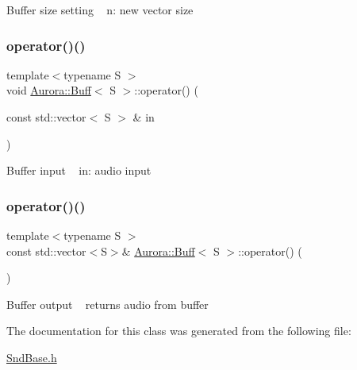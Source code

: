 Buffer size setting ~\newline
n\+: new vector size \mbox{\label{class_aurora_1_1_buff_a40884550c6105f427148f8663a54bc71}} 
\subsubsection{\texorpdfstring{operator()()}{operator()()}\hspace{0.1cm}{\footnotesize\ttfamily [1/2]}}
{\footnotesize\ttfamily template$<$typename S $>$ \\
void \hyperlink{class_aurora_1_1_buff}{Aurora\+::\+Buff}$<$ S $>$\+::operator() (\begin{DoxyParamCaption}\item[{const std\+::vector$<$ S $>$ \&}]{in }\end{DoxyParamCaption})\hspace{0.3cm}{\ttfamily [inline]}}

Buffer input ~\newline
in\+: audio input ~\newline
\mbox{\label{class_aurora_1_1_buff_ad1ccc1beacd029ca12f38005e3ae2daf}} 
\subsubsection{\texorpdfstring{operator()()}{operator()()}\hspace{0.1cm}{\footnotesize\ttfamily [2/2]}}
{\footnotesize\ttfamily template$<$typename S $>$ \\
const std\+::vector$<$S$>$\& \hyperlink{class_aurora_1_1_buff}{Aurora\+::\+Buff}$<$ S $>$\+::operator() (\begin{DoxyParamCaption}{ }\end{DoxyParamCaption})\hspace{0.3cm}{\ttfamily [inline]}}

Buffer output ~\newline
returns audio from buffer ~\newline


The documentation for this class was generated from the following file\+:\begin{DoxyCompactItemize}
\item 
\hyperlink{_snd_base_8h}{Snd\+Base.\+h}\end{DoxyCompactItemize}
